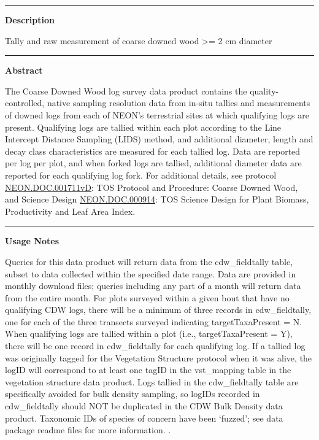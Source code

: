 \documentclass[]{article}
\begin{document}
\begin{center}\rule{0.5\linewidth}{\linethickness}\end{center}

\textbf{Description}

Tally and raw measurement of coarse downed wood \textgreater{}= 2 cm
diameter

\begin{center}\rule{0.5\linewidth}{\linethickness}\end{center}

\textbf{Abstract}

The Coarse Downed Wood log survey data product contains the
quality-controlled, native sampling resolution data from in-situ tallies
and measurements of downed logs from each of NEON's terrestrial sites at
which qualifying logs are present. Qualifying logs are tallied within
each plot according to the Line Intercept Distance Sampling (LIDS)
method, and additional diameter, length and decay class characteristics
are measured for each tallied log. Data are reported per log per plot,
and when forked logs are tallied, additional diameter data are reported
for each qualifying log fork. For additional details, see protocol
\href{http://data.neonscience.org/api/v0/documents/NEON.DOC.001711vD}{NEON.DOC.001711vD}:
TOS Protocol and Procedure: Coarse Downed Wood, and Science Design
\href{http://data.neonscience.org/api/v0/documents/NEON.DOC.000914vA}{NEON.DOC.000914}:
TOS Science Design for Plant Biomass, Productivity and Leaf Area Index.

\begin{center}\rule{0.5\linewidth}{\linethickness}\end{center}

\textbf{Usage Notes}

Queries for this data product will return data from the cdw\_fieldtally
table, subset to data collected within the specified date range. Data
are provided in monthly download files; queries including any part of a
month will return data from the entire month. For plots surveyed within
a given bout that have no qualifying CDW logs, there will be a minimum
of three records in cdw\_fieldtally, one for each of the three transects
surveyed indicating targetTaxaPresent = N. When qualifying logs are
tallied within a plot (i.e., targetTaxaPresent = Y), there will be one
record in cdw\_fieldtally for each qualifying log. If a tallied log was
originally tagged for the Vegetation Structure protocol when it was
alive, the logID will correspond to at least one tagID in the
vst\_mapping table in the vegetation structure data product. Logs
tallied in the cdw\_fieldtally table are specifically avoided for bulk
density sampling, so logIDs recorded in cdw\_fieldtally should NOT be
duplicated in the CDW Bulk Density data product. Taxonomic IDs of
species of concern have been `fuzzed'; see data package readme files for
more information. \newpage
.
\end{document}
